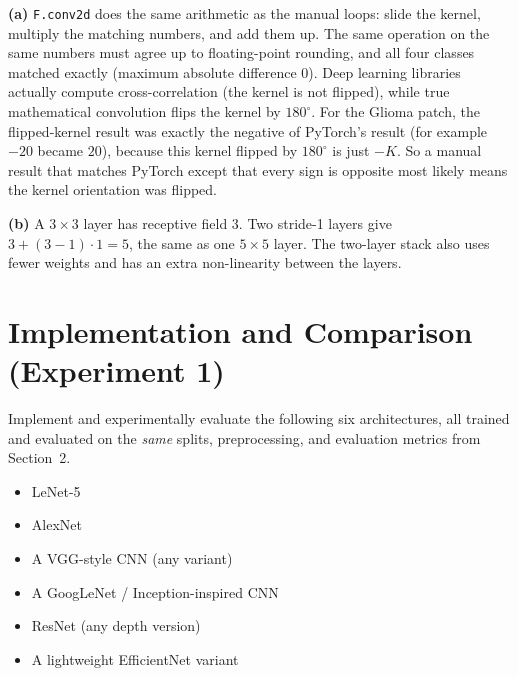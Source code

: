 \documentclass[12pt,a4paper]{article}
\begin{document}
\begin{answerbox}
\textbf{(a)} \texttt{F.conv2d} does the same arithmetic as the manual loops: slide the kernel, multiply the
matching numbers, and add them up. The same operation on the same numbers must agree up to floating-point
rounding, and all four classes matched exactly (maximum absolute difference $0$). Deep learning libraries
actually compute cross-correlation (the kernel is not flipped), while true mathematical convolution flips the
kernel by $180^\circ$. For the Glioma patch, the flipped-kernel result was exactly the negative of PyTorch's
result (for example $-20$ became $20$), because this kernel flipped by $180^\circ$ is just $-K$. So a manual
result that matches PyTorch except that every sign is opposite most likely means the kernel orientation
was flipped.\par
\textbf{(b)} A $3\times3$ layer has receptive field $3$. Two stride-1 layers give
$3+(3-1)\cdot1=5$, the same as one $5\times5$ layer. The two-layer stack also uses fewer weights and has an
extra non-linearity between the layers.
\end{answerbox}

\section{Implementation and Comparison (Experiment 1)}

Implement and experimentally evaluate the following six architectures, all trained
and evaluated on the \emph{same} splits, preprocessing, and evaluation metrics from
Section~2.

\begin{itemize}[leftmargin=*]
  \item LeNet-5
  \item AlexNet
  \item A VGG-style CNN (any variant)
  \item A GoogLeNet / Inception-inspired CNN
  \item ResNet (any depth version)
  \item A lightweight EfficientNet variant
\end{itemize}
\end{document}
